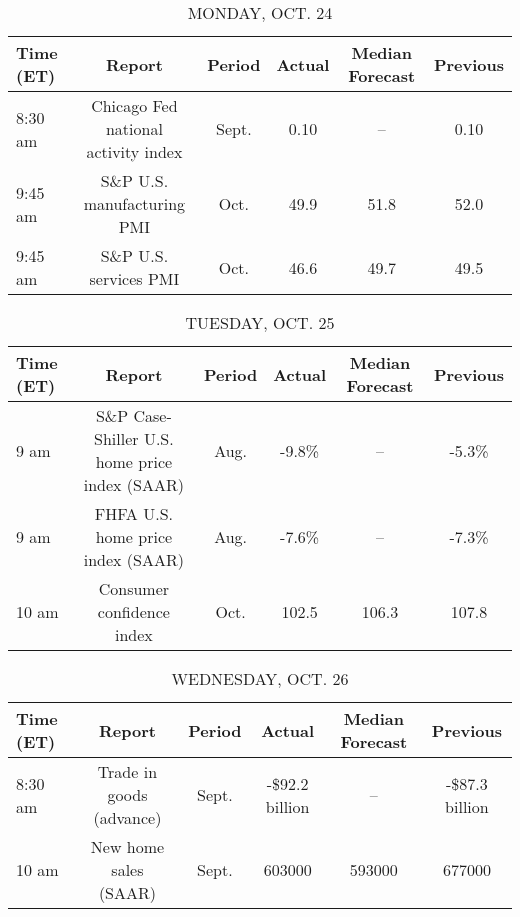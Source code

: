 \documentclass{article}%
\begin{document}
%
\normalsize%


\begin{table}[htbp]%
\caption{MONDAY, OCT. 24}%
\centering%
\begin{adjustbox}{width=1\textwidth}%
\begin{tabular}{lccccc}
\toprule
Time (ET) &                              Report & Period & Actual & Median Forecast & Previous \\
\midrule
  8:30 am & Chicago Fed national activity index &  Sept. &   0.10 &              -- &     0.10 \\
  9:45 am &          S\&P U.S. manufacturing PMI &   Oct. &   49.9 &            51.8 &     52.0 \\
  9:45 am &               S\&P U.S. services PMI &   Oct. &   46.6 &            49.7 &     49.5 \\
\bottomrule
\end{tabular}
%
\end{adjustbox}%
\end{table}

%


\begin{table}[htbp]%
\caption{TUESDAY, OCT. 25}%
\centering%
\begin{adjustbox}{width=1\textwidth}%
\begin{tabular}{lccccc}
\toprule
Time (ET) &                                        Report & Period & Actual & Median Forecast & Previous \\
\midrule
     9 am & S\&P Case-Shiller U.S. home price index (SAAR) &   Aug. &  -9.8\% &              -- &    -5.3\% \\
     9 am &             FHFA U.S. home price index (SAAR) &   Aug. &  -7.6\% &              -- &    -7.3\% \\
    10 am &                     Consumer confidence index &   Oct. &  102.5 &           106.3 &    107.8 \\
\bottomrule
\end{tabular}
%
\end{adjustbox}%
\end{table}

%


\begin{table}[htbp]%
\caption{WEDNESDAY, OCT. 26}%
\centering%
\begin{adjustbox}{width=1\textwidth}%
\begin{tabular}{lccccc}
\toprule
Time (ET) &                   Report & Period &         Actual & Median Forecast &       Previous \\
\midrule
  8:30 am & Trade in goods (advance) &  Sept. & -\$92.2 billion &              -- & -\$87.3 billion \\
    10 am &    New home sales (SAAR) &  Sept. &         603000 &          593000 &         677000 \\
\bottomrule
\end{tabular}
%
\end{adjustbox}%
\end{table}
\end{document}
